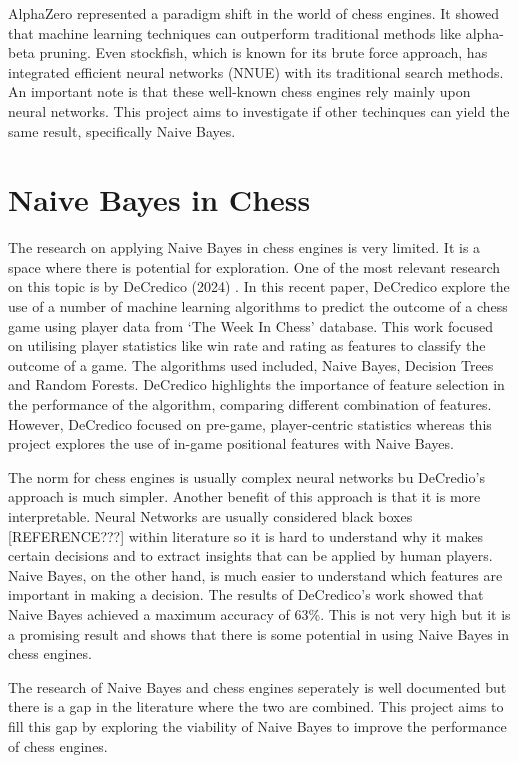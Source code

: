 AlphaZero represented a paradigm shift in the world of chess engines. It showed that machine learning techniques can outperform traditional methods like alpha-beta pruning. Even stockfish, which is known for its brute force approach, has integrated efficient neural networks (NNUE) with its traditional search methods. An important note is that these well-known chess engines rely mainly upon neural networks. This project aims to investigate if other techinques can yield the same result, specifically Naive Bayes. 


\section{Naive Bayes in Chess}

The research on applying Naive Bayes in chess engines is very limited. It is a space where there is potential for exploration. One of the most relevant research on this topic is by DeCredico (2024) \cite{decredicoUsingMachineLearning}. In this recent paper, DeCredico explore the use of a number of machine learning algorithms to predict the outcome of a chess game using player data from `The Week In Chess' database. This work focused on utilising player statistics like win rate and rating as features to classify the outcome of a game. The algorithms used included, Naive Bayes, Decision Trees and Random Forests. DeCredico highlights the importance of feature selection in the performance of the algorithm, comparing different combination of features. However, DeCredico focused on pre-game, player-centric statistics whereas this project explores the use of in-game positional features with Naive Bayes. 

The norm for chess engines is usually complex neural networks bu DeCredio's approach is much simpler. Another benefit of this approach is that it is more interpretable. Neural Networks are usually considered black boxes [REFERENCE???] within literature so it is hard to understand why it makes certain decisions and to extract insights that can be applied by human players. Naive Bayes, on the other hand, is much easier to understand which features are important in making a decision. The results of DeCredico's work showed that Naive Bayes achieved a maximum accuracy of 63\%. This is not very high but it is a promising result and shows that there is some potential in using Naive Bayes in chess engines. 

The research of Naive Bayes and chess engines seperately is well documented but there is a gap in the literature where the two are combined. This project aims to fill this gap by exploring the viability of Naive Bayes to improve the performance of chess engines.